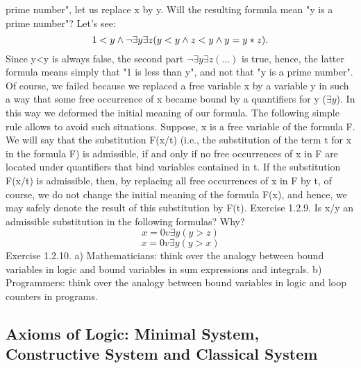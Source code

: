 prime number", let us replace x by y. Will the resulting formula mean "y is a prime number"? Let's see:
\[1<y \wedge  \neg \exists y\exists z(y<y \wedge  z<y \wedge  y=y*z).\]
Since y<y is always false, the second part \(\neg \exists y\exists z(...)\) is true, hence, the latter formula means simply that
"1 is less than y", and not that "y is a prime number".
Of course, we failed because we replaced a free variable x by a variable y in such a way that some free
occurrence of x became bound by a quantifiers for y (\(\exists y\)). In this way we deformed the initial meaning
of our formula.
The following simple rule allows to avoid such situations. Suppose, x is a free variable of the formula F.
We will say that the substitution F(x/t) (i.e., the substitution of the term t for x in the formula F) is
admissible, if and only if no free occurrences of x in F are located under quantifiers that bind variables
contained in t. If the substitution F(x/t) is admissible, then, by replacing all free occurrences of x in F by t,
of course, we do not change the initial meaning of the formula F(x), and hence, we may safely denote the
result of this substitution by F(t).
Exercise 1.2.9. Is x/y an admissible substitution in the following formulas? Why?
\[x=0 v \exists y(y>z)\]
\[x=0 v \exists y(y>x)\]
Exercise 1.2.10. a) Mathematicians: think over the analogy between bound variables in logic and bound
variables in sum expressions and integrals.
b) Programmers: think over the analogy between bound variables in logic and loop counters in programs.

\subsection{Axioms of Logic: Minimal System, Constructive System and Classical System}

